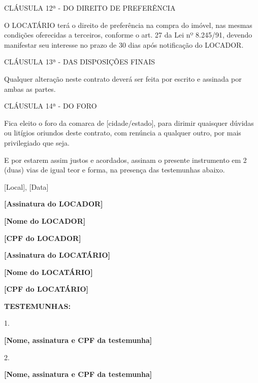 \begin{anexosenv}
CLÁUSULA 12ª - DO DIREITO DE PREFERÊNCIA

O LOCATÁRIO terá o direito de preferência na compra do imóvel, nas mesmas condições oferecidas a terceiros, conforme o art. 27 da Lei nº 8.245/91, devendo manifestar seu interesse no prazo de 30 dias após notificação do LOCADOR.

CLÁUSULA 13ª - DAS DISPOSIÇÕES FINAIS

Qualquer alteração neste contrato deverá ser feita por escrito e assinada por ambas as partes.

CLÁUSULA 14ª - DO FORO

Fica eleito o foro da comarca de [cidade/estado], para dirimir quaisquer dúvidas ou litígios oriundos deste contrato, com renúncia a qualquer outro, por mais privilegiado que seja.

E por estarem assim justos e acordados, assinam o presente instrumento em 2 (duas) vias de igual teor e forma, na presença das testemunhas abaixo.



\begin{center}
	[Local], [Data] \par
	\vspace{0.75cm}
	\hrulefill \par
	
	\textbf{[Assinatura do LOCADOR]} \par
	\textbf{[Nome do LOCADOR]} \par
	\textbf{[CPF do LOCADOR]} \par
	\vspace{0.75cm}
	\hrulefill \par
	
	\textbf{[Assinatura do LOCATÁRIO]} \par
	\textbf{[Nome do LOCATÁRIO]} \par
	\textbf{[CPF do LOCATÁRIO]} \par
	\vspace{0.75cm}
	\textbf{TESTEMUNHAS:} \par
	\vspace{1cm}
	
	1. \hrulefill \par
	\textbf{[Nome, assinatura e CPF da testemunha]} \par
	\vspace{1cm}
	
	2. \hrulefill \par
	\textbf{[Nome, assinatura e CPF da testemunha]} \par
\end{center}








\end{anexosenv}
